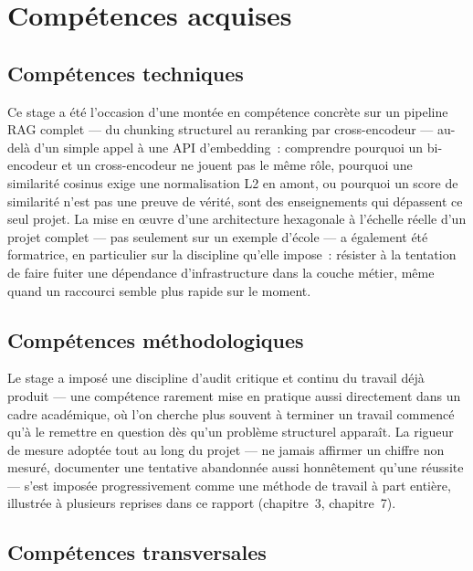 \documentclass[12pt,a4paper]{article}
\begin{document}
\enlargethispage{\baselineskip}
\newpage
\section{Comp\'etences acquises}

\subsection{Comp\'etences techniques}

Ce stage a \'et\'e l'occasion d'une mont\'ee en comp\'etence concr\`ete sur un pipeline RAG complet --- du chunking structurel au reranking par cross-encodeur --- au-del\`a d'un simple appel \`a une API d'embedding~: comprendre pourquoi un bi-encodeur et un cross-encodeur ne jouent pas le m\^eme r\^ole, pourquoi une similarit\'e cosinus exige une normalisation L2 en amont, ou pourquoi un score de similarit\'e n'est pas une preuve de v\'erit\'e, sont des enseignements qui d\'epassent ce seul projet. La mise en \oe{}uvre d'une architecture hexagonale \`a l'\'echelle r\'eelle d'un projet complet --- pas seulement sur un exemple d'\'ecole --- a \'egalement \'et\'e formatrice, en particulier sur la discipline qu'elle impose~: r\'esister \`a la tentation de faire fuiter une d\'ependance d'infrastructure dans la couche m\'etier, m\^eme quand un raccourci semble plus rapide sur le moment.

\subsection{Comp\'etences m\'ethodologiques}

Le stage a impos\'e une discipline d'audit critique et continu du travail d\'ej\`a produit --- une comp\'etence rarement mise en pratique aussi directement dans un cadre acad\'emique, o\`u l'on cherche plus souvent \`a terminer un travail commenc\'e qu'\`a le remettre en question d\`es qu'un probl\`eme structurel appara\^it. La rigueur de mesure adopt\'ee tout au long du projet --- ne jamais affirmer un chiffre non mesur\'e, documenter une tentative abandonn\'ee aussi honn\^etement qu'une r\'eussite --- s'est impos\'ee progressivement comme une m\'ethode de travail \`a part enti\`ere, illustr\'ee \`a plusieurs reprises dans ce rapport (chapitre~3, chapitre~7).

\subsection{Comp\'etences transversales}
\end{document}
